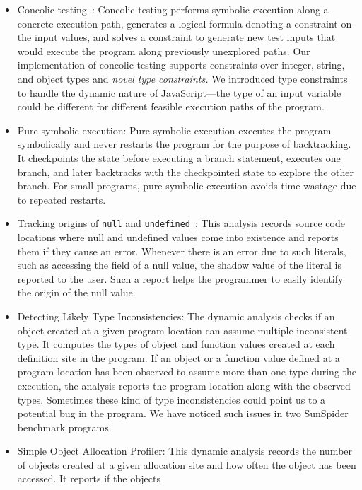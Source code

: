 \documentclass{sig-alternate}
\begin{document}
\begin{itemize}
\item Concolic testing~\cite{dart,cute}: Concolic testing performs
  symbolic execution along a concrete execution path, generates a
  logical formula denoting a constraint on the input values, and
  solves a constraint to generate new test inputs that would execute
  the program along previously unexplored paths.  Our implementation
  of concolic testing supports constraints over integer, string, and
  object types and \emph{novel type constraints.}  We introduced type
  constraints to handle the dynamic nature of JavaScript---the type of
  an input variable could be different for different feasible
  execution paths of the program.
\item Pure symbolic execution: Pure symbolic execution executes the
  program symbolically and never restarts the program for the purpose
  of backtracking.  It checkpoints the state before executing a branch
  statement, executes one branch, and later backtracks with the
  checkpointed state to explore the other branch.  For small programs,
  pure symbolic execution avoids time wastage due to repeated
  restarts.
\item Tracking origins of \texttt{null} and
  \texttt{undefined}~\cite{Bond:2007:TBA:1297027.1297057}: This
  analysis records source code locations where null and undefined
  values come into existence and reports them if they cause an error.
  Whenever there is an error due to such literals, such as accessing
  the field of a null value, the shadow value of the literal is
  reported to the user.  Such a report helps the programmer to easily
  identify the origin of the null value.
\item Detecting Likely Type Inconsistencies: The dynamic analysis
  checks if an object created at a given program location can assume
  multiple inconsistent type.  It computes the types of object and
  function values created at each definition site in the program.  If
  an object or a function value defined at a program location has been
  observed to assume more than one type during the execution, the
  analysis reports the program location along with the observed types.
  Sometimes these kind of type inconsistencies could point us to a
  potential bug in the program.  We have noticed such issues in two
  SunSpider benchmark programs.
\item Simple Object Allocation Profiler: This dynamic analysis records
  the number of objects created at a given allocation site and how
  often the object has been accessed.  It reports if the objects

\end{itemize}
\end{document}
